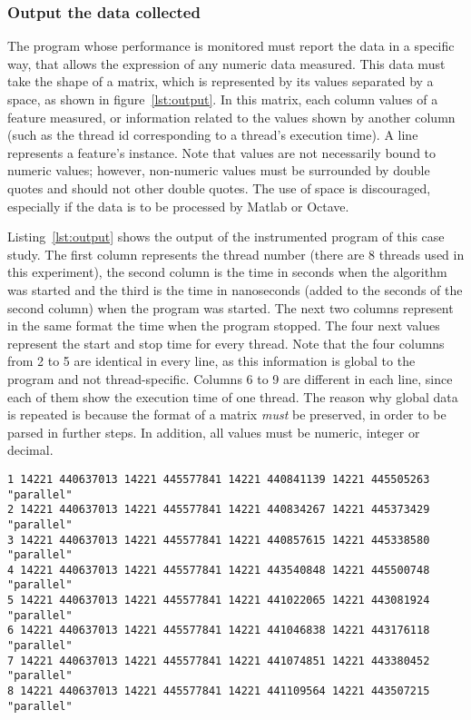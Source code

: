 \subsubsection{Output the data collected}
The program whose performance is monitored must report the data in a specific way, that allows the expression of any numeric data measured. This data must take the shape of a matrix, which is represented by its values separated by a space, as shown in figure~\ref{lst:output}. In this matrix, each column values of a feature measured, or information related to the values shown by another column (such as the thread id corresponding to a thread's execution time). A line represents a feature's instance. Note that values are not necessarily bound to numeric values; however, non-numeric values must be surrounded by double quotes and should not other double quotes. The use of space is discouraged, especially if the data is to be processed by Matlab or Octave.

Listing~\ref{lst:output} shows the output of the instrumented program of this case study. The first column represents the thread number (there are 8 threads used in this experiment), the second column is the time in seconds when the algorithm was started and the third is the time in nanoseconds (added to the seconds of the second column) when the program was started. The next two columns represent in the same format the time when the program stopped. The four next values represent the start and stop time for every thread. Note that the four columns from 2 to 5 are identical in every line, as this information is global to the program and not thread-specific. Columns 6 to 9 are different in each line, since each of them show the execution time of one thread. The reason why global data is repeated is because the format of a matrix \emph{must} be preserved, in order to be parsed in further steps. In addition, all values must be numeric, integer or decimal.

\begin{lstlisting}[caption={Format the data must take when output from an instrumented program.},label={lst:output},basicstyle=\ttfamily\scriptsize]
1 14221 440637013 14221 445577841 14221 440841139 14221 445505263 "parallel"
2 14221 440637013 14221 445577841 14221 440834267 14221 445373429 "parallel"
3 14221 440637013 14221 445577841 14221 440857615 14221 445338580 "parallel"
4 14221 440637013 14221 445577841 14221 443540848 14221 445500748 "parallel"
5 14221 440637013 14221 445577841 14221 441022065 14221 443081924 "parallel"
6 14221 440637013 14221 445577841 14221 441046838 14221 443176118 "parallel"
7 14221 440637013 14221 445577841 14221 441074851 14221 443380452 "parallel"
8 14221 440637013 14221 445577841 14221 441109564 14221 443507215 "parallel"
\end{lstlisting}

